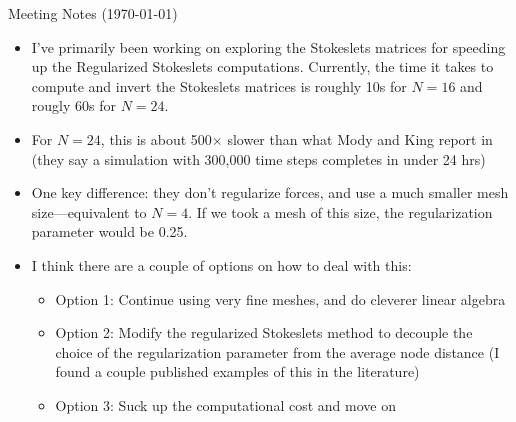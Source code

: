 \documentclass{article}
\begin{document}
\pagestyle{plain}

\begin{center}
  {\Large Meeting Notes (\today)}
\end{center}

\begin{itemize}
\item I've primarily been working on exploring the Stokeslets matrices
  for speeding up the Regularized Stokeslets computations. Currently,
  the time it takes to compute and invert the Stokeslets matrices is
  roughly 10s for $N = 16$ and rougly 60s for $N = 24$.
\item For $N = 24$, this is about 500$\times$ slower than what Mody
  and King report in \cite{Mody2005} (they say a simulation with
  300,000 time steps completes in under 24 hrs)
\item One key difference: they don't regularize forces, and use a
  much smaller mesh size---equivalent to $N = 4$. If we took a mesh of
  this size, the regularization parameter would be 0.25.
\item I think there are a couple of options on how to deal with this:
  \begin{itemize}
  \item Option 1: Continue using very fine meshes, and do cleverer
    linear algebra
  \item Option 2: Modify the regularized Stokeslets method to decouple
    the choice of the regularization parameter from the average node
    distance (I found a couple published examples of this in the
    literature)
  \item Option 3: Suck up the computational cost and move on
  \end{itemize}
\end{itemize}
\end{document}
